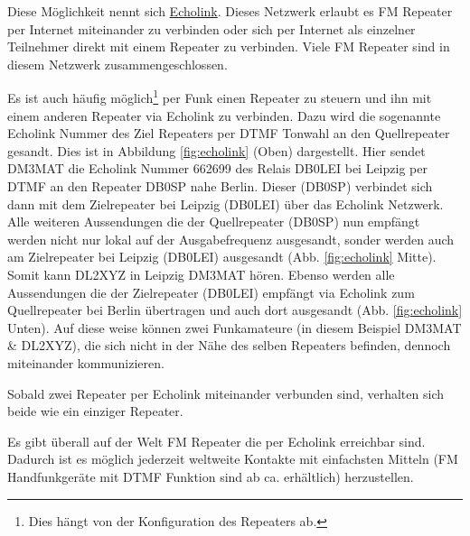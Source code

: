 Diese Möglichkeit nennt sich \href{http://www.echolink.org/}{Echolink}. Dieses Netzwerk erlaubt es FM Repeater per Internet miteinander zu verbinden oder sich per Internet als einzelner Teilnehmer direkt mit einem Repeater zu verbinden. Viele FM Repeater sind in diesem Netzwerk zusammengeschlossen. 

Es ist auch häufig möglich\footnote{Dies hängt von der Konfiguration des Repeaters ab.} per Funk einen Repeater zu steuern und ihn mit einem anderen Repeater via Echolink zu verbinden. Dazu wird die sogenannte Echolink Nummer des Ziel Repeaters per DTMF Tonwahl an den Quellrepeater gesandt. Dies ist in Abbildung \ref{fig:echolink} (Oben) dargestellt. Hier sendet DM3MAT die Echolink Nummer 662699 des Relais DB0LEI bei Leipzig per DTMF an den Repeater DB0SP nahe Berlin. Dieser (DB0SP) verbindet sich dann mit dem Zielrepeater bei Leipzig (DB0LEI) über das Echolink Netzwerk. Alle weiteren Aussendungen die der Quellrepeater (DB0SP) nun empfängt werden nicht nur lokal auf der Ausgabefrequenz ausgesandt, sonder werden auch am Zielrepeater bei Leipzig (DB0LEI) ausgesandt (Abb. \ref{fig:echolink} Mitte). Somit kann DL2XYZ in Leipzig DM3MAT hören. Ebenso werden alle Aussendungen die der Zielrepeater (DB0LEI) empfängt via Echolink zum Quellrepeater bei Berlin übertragen und auch dort ausgesandt (Abb. \ref{fig:echolink} Unten).  Auf diese weise können zwei Funkamateure (in diesem Beispiel DM3MAT \& DL2XYZ), die sich nicht in der Nähe des selben Repeaters befinden, dennoch miteinander kommunizieren. 

\begin{merke}
Sobald zwei Repeater per Echolink miteinander verbunden sind, verhalten sich beide wie ein einziger Repeater. 
\end{merke}

Es gibt überall auf der Welt FM Repeater die per Echolink erreichbar sind. Dadurch ist es möglich jederzeit weltweite Kontakte mit einfachsten Mitteln (FM Handfunkgeräte mit DTMF Funktion sind ab ca.  erhältlich) herzustellen.